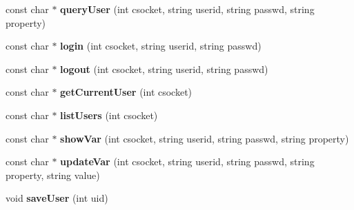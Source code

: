 \begin{CompactItemize}
\item 
const char $\ast$ \textbf{queryUser} (int csocket, string userid, string passwd, string property)\label{classbr_1_1pucrio_1_1telemidia_1_1ginga_1_1ncl_1_1adaptation_1_1context_1_1AuthenticationServer_aa6e7de012af9540ee2e614da2c316c8}

\item 
const char $\ast$ \textbf{login} (int csocket, string userid, string passwd)\label{classbr_1_1pucrio_1_1telemidia_1_1ginga_1_1ncl_1_1adaptation_1_1context_1_1AuthenticationServer_8be2ada34c275124f58a7575e7b60d6f}

\item 
const char $\ast$ \textbf{logout} (int csocket, string userid, string passwd)\label{classbr_1_1pucrio_1_1telemidia_1_1ginga_1_1ncl_1_1adaptation_1_1context_1_1AuthenticationServer_6ca55fdb77792789cd15833e6da791bd}

\item 
const char $\ast$ \textbf{getCurrentUser} (int csocket)\label{classbr_1_1pucrio_1_1telemidia_1_1ginga_1_1ncl_1_1adaptation_1_1context_1_1AuthenticationServer_79ec333648a5f32889dd269d266b270f}

\item 
const char $\ast$ \textbf{listUsers} (int csocket)\label{classbr_1_1pucrio_1_1telemidia_1_1ginga_1_1ncl_1_1adaptation_1_1context_1_1AuthenticationServer_e5789d872618edb672f255d8844377f5}

\item 
const char $\ast$ \textbf{showVar} (int csocket, string userid, string passwd, string property)\label{classbr_1_1pucrio_1_1telemidia_1_1ginga_1_1ncl_1_1adaptation_1_1context_1_1AuthenticationServer_d43c7803614eacda2288c0db36444817}

\item 
const char $\ast$ \textbf{updateVar} (int csocket, string userid, string passwd, string property, string value)\label{classbr_1_1pucrio_1_1telemidia_1_1ginga_1_1ncl_1_1adaptation_1_1context_1_1AuthenticationServer_45390e5e74d3c68106619561242e812d}

\item 
void \textbf{saveUser} (int uid)\label{classbr_1_1pucrio_1_1telemidia_1_1ginga_1_1ncl_1_1adaptation_1_1context_1_1AuthenticationServer_3a046d2878ed7a0efe884e5edb6e2c4d}

\end{CompactItemize}
